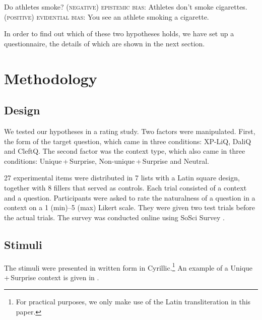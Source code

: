 \documentclass[output=paper]{langscibook}
\begin{document}

\ea
\ea Do athletes smoke?
\ex \textsc{(negative) epistemic bias}: Athletes don't smoke cigarettes.
\ex \textsc{(positive) evidential bias}: You see an athlete smoking a cigarette.
\z \label{smoke} \z

\noindent
In order to find out which of these two hypotheses holds, we have set up a questionnaire, the details of which are shown in the next section.
\section{Methodology}\label{sec:method}

\subsection{Design}\largerpage
We tested our hypotheses in a rating study. Two factors were manipulated. First, the form of the target question, which came in three conditions: XP-LiQ, DaliQ and CleftQ. The second factor was the context type, which also came in three conditions: Unique\,+\,Surprise, Non-unique\,+\,Surprise and Neutral.

27 experimental items were distributed in 7 lists with a Latin square design, together with 8 fillers that served as controls. Each trial consisted of a context and a question.
Participants were asked to rate the naturalness of a question in a context on a 1 (min)--5 (max) Likert scale. They were given two test trials before the actual trials. The survey was conducted online using SoSci Survey \citep{leiner2014}.


 \subsection{Stimuli}
 The stimuli were presented in written form in  Cyrillic.\footnote{For practical purposes, we only make use of the Latin transliteration in this paper.} An example of a Unique\,+\,Surprise context is given in .

\end{document}
